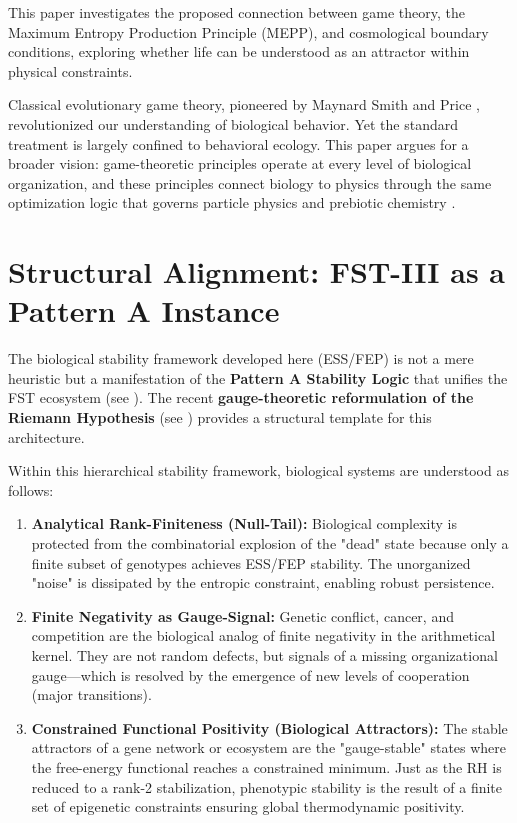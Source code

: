\documentclass[12pt,a4paper]{article}
\theoremstyle{remark}
\begin{document}
This paper investigates the proposed connection between game theory, the Maximum Entropy Production Principle (MEPP), and cosmological boundary conditions, exploring whether life can be understood as an attractor within physical constraints.

Classical evolutionary game theory, pioneered by Maynard Smith and Price \citep{MaynardSmith1982}, revolutionized our understanding of biological behavior. Yet the standard treatment is largely confined to behavioral ecology. This paper argues for a broader vision: game-theoretic principles operate at every level of biological organization, and these principles connect biology to physics through the same optimization logic that governs particle physics \citep{FSTI} and prebiotic chemistry \citep{FSTII}.

\section{Structural Alignment: FST-III as a Pattern A Instance}
\label{sec:structural-alignment}

The biological stability framework developed here (ESS/FEP) is not a mere heuristic but a manifestation of the \textbf{Pattern A Stability Logic} that unifies the FST ecosystem (see \cite{FST-Unified2026}). The recent \textbf{gauge-theoretic reformulation of the Riemann Hypothesis} (see \cite{FST-RH3}) provides a structural template for this architecture.

Within this hierarchical stability framework, biological systems are understood as follows:
\begin{enumerate}[label=\alph*)]
    \item \textbf{Analytical Rank-Finiteness (Null-Tail):} Biological complexity is protected from the combinatorial explosion of the "dead" state because only a finite subset of genotypes achieves ESS/FEP stability. The unorganized "noise" is dissipated by the entropic constraint, enabling robust persistence.
    \item \textbf{Finite Negativity as Gauge-Signal:} Genetic conflict, cancer, and competition are the biological analog of finite negativity in the arithmetical kernel. They are not random defects, but signals of a missing organizational gauge—which is resolved by the emergence of new levels of cooperation (major transitions).
    \item \textbf{Constrained Functional Positivity (Biological Attractors):} The stable attractors of a gene network or ecosystem are the "gauge-stable" states where the free-energy functional reaches a constrained minimum. Just as the RH is reduced to a rank-2 stabilization, phenotypic stability is the result of a finite set of epigenetic constraints ensuring global thermodynamic positivity.
\end{enumerate}
\end{document}

